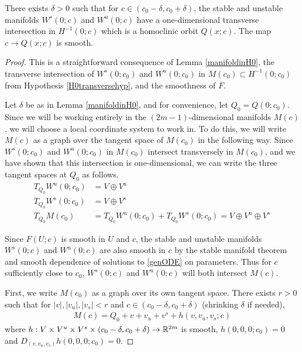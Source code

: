 \documentclass[thesis.tex]{subfiles}
\begin{document}
\begin{lemma}\label{Qcexistslemma}
There exists $\delta > 0$ such that for $c \in (c_0 - \delta, c_0 + \delta)$, the stable and unstable manifolds $W^s(0; c)$ and $W^u(0; c)$ have a one-dimensional transverse intersection in $H^{-1}(0; c)$ which is a homoclinic orbit $Q(x; c)$. The map $c \rightarrow Q(x; c)$ is smooth.

\begin{proof}
This is a straightforward consequence of Lemma \ref{manifoldinH0}, the transverse intersection of $W^s(0; c_0)$ and $W^u(0; c_0)$ in $M(c_0) \subset H^{-1}(0; c_0)$ from Hypothesis \ref{H0transversehyp}, and the smoothness of $F$.

Let $\delta$ be as in Lemma \ref{manifoldinH0}, and for convenience, let $Q_0 = Q(0; c_0)$. Since we will be working entirely in the $(2m-1)$-dimensional manifolds $M(c)$, we will choose a local coordinate system to work in. To do this, we will write $M(c)$ as a graph over the tangent space of $M(c_0)$ in the following way. Since $W^s(0; c_0)$ and $W^u(0; c_0)$ in $M(c_0)$ intersect transversely in $M(c_0)$, and we have shown that this intersection is one-dimensional, we can write the three tangent spaces at $Q_0$ as follows.
\begin{align*}
T_{Q_0}W^u(0; c_0) &= V \oplus V^u \\
T_{Q_0}W^s(0; c_0) &= V \oplus V^s \\
T_{Q_0}M(c_0) &= T_{Q_0}W^u(0; c_0) 
+ T_{Q_0}W^s(0; c_0) = V \oplus V^u \oplus V^s
\end{align*}

Since $F(U; c)$ is smooth in $U$ and $c$, the stable and unstable manifolds $W^s(0; c)$ and $W^u(0; c)$ are also smooth in $c$ by the stable manifold theorem and smooth dependence of solutions to \eqref{genODE} on parameters. Thus for $c$ sufficiently close to $c_0$, $W^s(0; c)$ and $W^u(0; c)$ will both intersect $M(c)$. 

First, we write $M(c_0)$ as a graph over its own tangent space. There exists $r > 0$ such that for $|v|, |v_u|, |v_s| < r$ and $c \in (c_0 - \delta, c_0 + \delta)$ (shrinking $\delta$ if needed), 
\begin{align*}
M(c) = Q_0 + v + v_u + v^s + h(v, v_u, v_s; c)
\end{align*}
where $h: V \times V^u \times V^s \times (c_0 - \delta, c_0 + \delta) \rightarrow \mathbb{R}^{2m}$ is smooth, $h(0,0,0; c_0) = 0$ and $D_{(v, v_u, v_s)} h(0, 0, 0; c_0) = 0$.


\end{proof}
\end{lemma}
\end{document}
